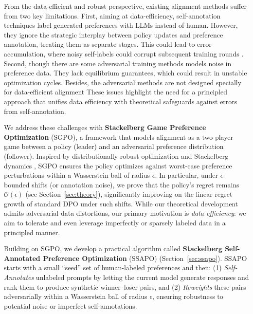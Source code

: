 From the data-efficient and robust perspective, existing alignment methods suffer from two key limitations. First, aiming at data-efficiency, self-annotation techniques \citep{Lee2024Rlaif,Yuan2024Self,Kim2025Spread} label generated preferences with LLMs instead of human. However, they ignore the strategic interplay between policy updates and preference annotation, treating them as separate stages. This could lead to error accumulation, where noisy self-labels could corrupt subsequent training rounds \citep{Chowdhury2024Provably} . %
Second, though there are some adversarial training methods \citep{Cheng2023Adversarial,Wu2024Towards} models noise in preference data. They lack equilibrium guarantees, which could result in unstable optimization cycles. Besides, the adversarial methods are not designed specially for data-efficient alignment These issues highlight the need for a principled approach that unifies data efficiency with theoretical safeguards against errors from self-annotation.

We address these challenges with \textbf{Stackelberg Game Preference Optimization} (SGPO), a framework that models alignment as a two-player game between a policy (leader) and an adversarial preference distribution (follower). Inspired by distributionally robust optimization \citep{Esfahani2018Data} and Stackelberg dynamics \citep{Bacsar1998Dynamic}, SGPO ensures the policy optimizes against worst-case preference perturbations within a Wasserstein-ball of radius $\epsilon$.  In particular, under $\epsilon$-bounded shifts (or annotation noise), we prove that the policy’s regret remains $\mathcal{O}(\epsilon)$ (see Section~\ref{sec:theory}), significantly improving on the linear regret growth of standard DPO under such shifts. While our theoretical development admits adversarial data distortions, our primary motivation is \emph{data efficiency}: we aim to tolerate and even leverage imperfectly or sparsely labeled data in a principled manner.

Building on SGPO, we develop a practical algorithm called \textbf{Stackelberg Self-Annotated Preference Optimization} (SSAPO) (Section~\ref{sec:ssapo}). SSAPO starts with a small “seed” set of human-labeled preferences and then: (1) \emph{Self-Annotates} unlabeled prompts by letting the current model generate responses and rank them to produce synthetic winner--loser pairs, and (2) \emph{Reweights} these pairs adversarially within a Wasserstein ball of radius $\epsilon$, ensuring robustness to potential noise or imperfect self-annotations.

